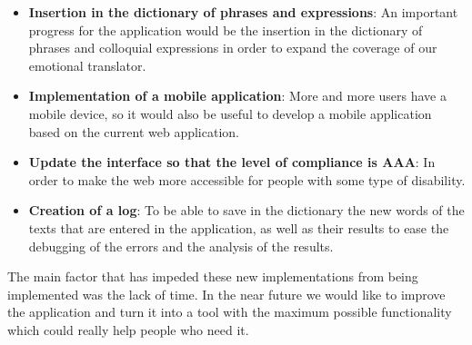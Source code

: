\begin{itemize}
	\item \textbf{Insertion in the dictionary of phrases and expressions}: An important progress for the application would be the insertion in the dictionary of phrases and colloquial expressions in order to expand the coverage of our emotional translator.
	\item \textbf{Implementation of a mobile application}: More and more users have a mobile device, so it would also be useful to develop a mobile application based on the current web application.
	\item \textbf{Update the interface so that the level of compliance is AAA}: In order to make the web more accessible for people with some type of disability.
	\item \textbf{Creation of a log}: To be able to save in the dictionary the new words of the texts that are entered in the application, as well as their results to ease the debugging of the errors and the analysis of the results.
\end{itemize}



The main factor that has impeded these new implementations from being implemented was the lack of time. In the near future we would like to improve the application and turn it into a tool with the maximum possible functionality which could really help people who need it.

